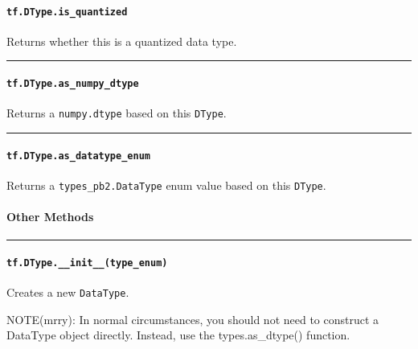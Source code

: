 \paragraph{\texorpdfstring{\lstinline{tf.DType.is_quantized}
}{tf.DType.is_quantized }}\label{tf.dtype.isux5fquantized}

Returns whether this is a quantized data type.

\begin{center}\rule{0.5\linewidth}{\linethickness}\end{center}

\paragraph{\texorpdfstring{\lstinline{tf.DType.as_numpy_dtype}
}{tf.DType.as_numpy_dtype }}\label{tf.dtype.asux5fnumpyux5fdtype}

Returns a \lstinline{numpy.dtype} based on this \lstinline{DType}.

\begin{center}\rule{0.5\linewidth}{\linethickness}\end{center}

\paragraph{\texorpdfstring{\lstinline{tf.DType.as_datatype_enum}
}{tf.DType.as_datatype_enum }}\label{tf.dtype.asux5fdatatypeux5fenum}

Returns a \lstinline{types_pb2.DataType} enum value based on this
\lstinline{DType}.

\paragraph{Other Methods }\label{other-methods-2}

\begin{center}\rule{0.5\linewidth}{\linethickness}\end{center}

\paragraph{\texorpdfstring{\lstinline{tf.DType.__init__(type_enum)}
}{tf.DType.__init__(type_enum) }}\label{tf.dtype.ux5fux5finitux5fux5ftypeux5fenum}

Creates a new \lstinline{DataType}.

NOTE(mrry): In normal circumstances, you should not need to construct a
DataType object directly. Instead, use the types.as_dtype() function.

